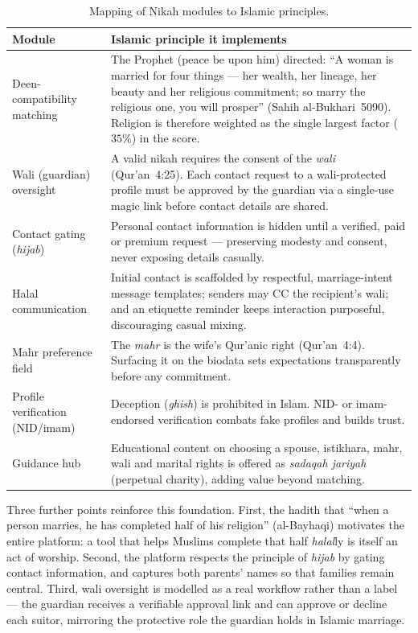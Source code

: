 \documentclass[12pt,a4paper]{report}
\begin{document}
\begin{table}[H]
\centering
\caption{Mapping of Nikah modules to Islamic principles.}
\label{tab:islamic-mapping}
\small
\renewcommand{\arraystretch}{1.25}
\begin{tabularx}{\textwidth}{l X}
\toprule
\textbf{Module} & \textbf{Islamic principle it implements} \\
\midrule
Deen-compatibility matching & The Prophet (peace be upon him) directed: ``A woman is married for four things --- her wealth, her lineage, her beauty and her religious commitment; so marry the religious one, you will prosper'' (Sahih al-Bukhari~5090). Religion is therefore weighted as the single largest factor ($35\%$) in the score. \\
Wali (guardian) oversight & A valid nikah requires the consent of the \emph{wali} (Qur'an~4:25). Each contact request to a wali-protected profile must be approved by the guardian via a single-use magic link before contact details are shared. \\
Contact gating (\emph{hijab}) & Personal contact information is hidden until a verified, paid or premium request --- preserving modesty and consent, never exposing details casually. \\
Halal communication & Initial contact is scaffolded by respectful, marriage-intent message templates; senders may CC the recipient's wali; and an etiquette reminder keeps interaction purposeful, discouraging casual mixing. \\
Mahr preference field & The \emph{mahr} is the wife's Qur'anic right (Qur'an~4:4). Surfacing it on the biodata sets expectations transparently before any commitment. \\
Profile verification (NID/imam) & Deception (\emph{ghish}) is prohibited in Islam. NID- or imam-endorsed verification combats fake profiles and builds trust. \\
Guidance hub & Educational content on choosing a spouse, istikhara, mahr, wali and marital rights is offered as \emph{sadaqah jariyah} (perpetual charity), adding value beyond matching. \\
\bottomrule
\end{tabularx}
\end{table}

Three further points reinforce this foundation. First, the hadith that
``when a person marries, he has completed half of his religion'' (al-Bayhaqi)
motivates the entire platform: a tool that helps Muslims complete that half
\emph{halal}ly is itself an act of worship. Second, the platform respects the
principle of \emph{hijab} by gating contact information, and captures both
parents' names so that families remain central. Third, wali oversight is
modelled as a real workflow rather than a label --- the guardian receives a
verifiable approval link and can approve or decline each suitor, mirroring the
protective role the guardian holds in Islamic marriage.
\end{document}
